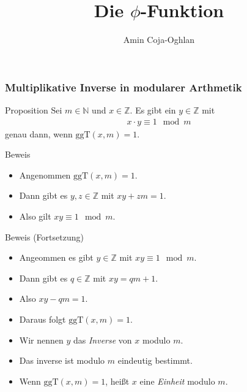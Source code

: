 \documentclass{beamer}
\title[Linadi]{Die $\phi$-Funktion}
\author[Amin Coja-Oghlan]{Amin Coja-Oghlan}
\institute[Frankfurt]{JWGUFFM}
\date{}
\renewcommand{\emph}[1]{{\textcolor{solarizedRed}{\itshape #1}}}
\newcommand\NN{\mathbb N}
\newcommand\ZZ{\mathbb Z}
\newcommand{\ggt}{\mathrm{ggT}}
\begin{document}
\frame[plain]{\titlepage}

\begin{frame}\frametitle{Multiplikative Inverse in modularer Arthmetik}
	\begin{block}{Proposition}
		Sei $m\in\NN$ und $x\in\ZZ$.
		Es gibt ein $y\in\ZZ$ mit
		\begin{align*}
			x\cdot y\equiv 1\mod m
		\end{align*}
		genau dann, wenn $\ggt(x,m)=1$.
	\end{block}
	\begin{overprint}
		\begin{block}{Beweis}
			\begin{itemize}
				\item Angenommen $\ggt(x,m)=1$.
				\item Dann gibt es $y,z\in\ZZ$ mit $xy+zm=1$.
				\item Also gilt $xy\equiv 1\mod m$.
			\end{itemize} 
		\end{block}
		\begin{block}{Beweis (Fortsetzung)}
			\begin{itemize}
				\item Angeommen es gibt $y\in\ZZ$ mit $xy\equiv 1\mod m$.
				\item Dann gibt es $q\in\ZZ$ mit $xy=qm+1$.
				\item Also $xy-qm=1$.
				\item Daraus folgt $\ggt(x,m)=1$.
			\end{itemize} 
		\end{block}
		\begin{block}{}
			\begin{itemize}
				\item Wir nennen $y$ das \emph{Inverse} von $x$ modulo $m$.
				\item Das inverse ist modulo $m$ eindeutig bestimmt.
				\item Wenn $\ggt(x,m)=1$, hei\ss t $x$ eine \emph{Einheit} modulo $m$.
			\end{itemize}
		\end{block}
	\end{overprint}
\end{frame}
\end{document}
